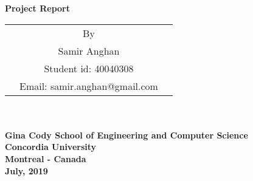 \thispagestyle{empty}
\begin{center}
\Large \textbf{Project Report\\}
\normalsize
\vspace{84pt}

\large
\begin{tabular}{ccc}
&By&\\
&Samir Anghan&\\
&Student id: 40040308&\\
&Email: samir.anghan@gmail.com&\\
\end{tabular}\\


\vspace{84pt}
\hspace{5cm} \makebox[6in]{\hrulefill}\\
\large
\textbf{Gina Cody School of Engineering and Computer Science}\\
\textbf{Concordia University} \\
\textbf{Montreal - Canada}\\
\vspace{24pt}
\textbf{July, 2019}
\end{center}
